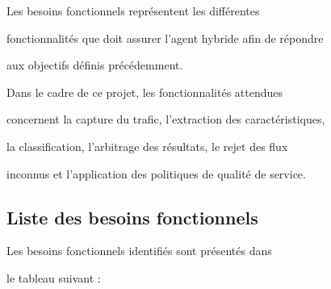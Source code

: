 Les besoins fonctionnels représentent les différentes

fonctionnalités que doit assurer l'agent hybride afin de répondre

aux objectifs définis précédemment.



Dans le cadre de ce projet, les fonctionnalités attendues

concernent la capture du trafic, l'extraction des caractéristiques,

la classification, l'arbitrage des résultats, le rejet des flux

inconnus et l'application des politiques de qualité de service.



\subsection{Liste des besoins fonctionnels}



Les besoins fonctionnels identifiés sont présentés dans

le tableau suivant :



